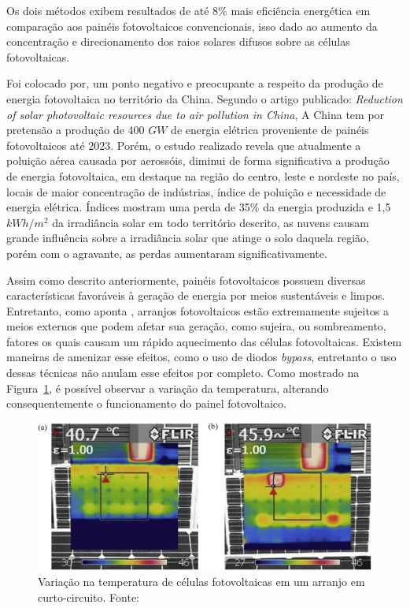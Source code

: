 Os dois métodos exibem resultados de até 8\% mais eficiência energética em comparação aos painéis fotovoltaicos convencionais, isso dado ao aumento da concentração e direcionamento dos raios solares difusos sobre as células fotovoltaicas.

Foi colocado por\cite{li2017reduction}, um ponto negativo e preocupante a respeito da produção de energia fotovoltaica no território da China. Segundo o artigo publicado: \textit{Reduction of solar photovoltaic resources due to air pollution in China}, A China tem por pretensão a produção de 400 $GW$ de energia elétrica proveniente de painéis fotovoltaicos até 2023. Porém, o estudo realizado revela que atualmente a poluição aérea causada por aerossóis, diminui de forma significativa a produção de energia fotovoltaica, em destaque na região do centro, leste e nordeste no país, locais de maior concentração de indústrias, índice de poluição e necessidade de energia elétrica. Índices mostram uma perda de 35\% da energia produzida e 1,5 $kWh/m^2$ da irradiância solar em todo território descrito, as nuvens causam grande influência sobre a irradiância solar que atinge o solo daquela região, porém com o agravante, as perdas aumentaram significativamente.

Assim como descrito anteriormente, painéis fotovoltaicos possuem diversas características favoráveis à geração de energia por meios sustentáveis e limpos. Entretanto, como aponta , arranjos fotovoltaicos estão extremamente sujeitos a meios externos que podem afetar sua geração, como sujeira, ou sombreamento, fatores os quais causam um rápido aquecimento das células fotovoltaicas. Existem maneiras de amenizar esse efeitos, como o uso de diodos \textit{bypass}, entretanto o uso dessas técnicas não anulam esse efeitos por completo. Como mostrado na Figura~\ref{fig:Temp}, é possível observar a variação da temperatura, alterando consequentemente o funcionamento do painel fotovoltaico.

\FloatBarrier
\begin{figure}[htbp]
	\centering
	\includegraphics[scale=1.3]{imagens/Temp_BRESSAN}
	\caption{Variação na temperatura de células fotovoltaicas em um arranjo em curto-circuito. Fonte:   }
	
	\label{fig:Temp}
\end{figure}
\FloatBarrier


